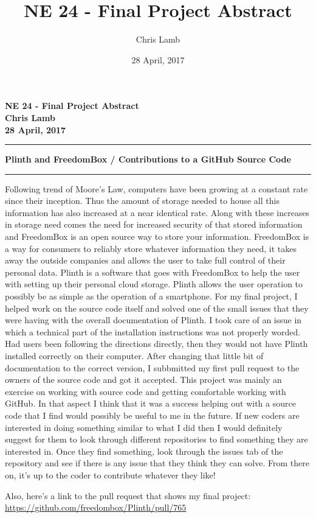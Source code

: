 \documentclass[12pt]{article}
\author{Chris Lamb}
\title{NE 24 - Final Project Abstract}
\date{28 April, 2017}
\begin{document}
\begin{center}
\textbf{NE 24 - Final Project Abstract \\ Chris Lamb \\ 28 April, 2017}
\end{center}
\noindent\rule{17cm}{1pt}

\begin{center}
\textbf{Plinth and FreedomBox / Contributions to a GitHub Source Code}
\rule{14cm}{0.4pt}
\end{center}

Following trend of Moore's Law, computers have been growing at a constant rate since their inception. Thus the amount of storage needed to house all this information has also increased at a near identical rate. Along with these increases in storage need comes the need for increased security of that stored information and FreedomBox is an open source way to store your information. FreedomBox is a way for consumers to reliably store whatever information they need, it takes away the outside companies and allows the user to take full control of their personal data. Plinth is a software that goes with FreedomBox to help the user with setting up their personal cloud storage. Plinth allows the user operation to possibly be as simple as the operation of a smartphone. For my final project, I helped work on the source code itself and solved one of the small issues that they were having with the overall documentation of Plinth. I took care of an issue in which a technical part of the installation instructions was not properly worded. Had users been following the directions directly, then they would not have Plinth installed correctly on their computer. After changing that little bit of documentation to the correct version, I subbmitted my first pull request to the owners of the source code and got it accepted. This project was mainly an exercise on working with source code and getting comfortable working with GitHub. In that aspect I think that it was a success helping out with a source code that I find would possibly be useful to me in the future. If new coders are interested in doing something similar to what I did then I would definitely suggest for them to look through different repositories to find something they are interested in. Once they find something, look through the issues tab of the repository and see if there is any issue that they think they can solve. From there on, it's up to the coder to contribute whatever they like!

\begin{center}
Also, here's a link to the pull request that shows my final project: \href{https://github.com/freedombox/Plinth/pull/765}{https://github.com/freedombox/Plinth/pull/765}
\end{center}
\end{document}
